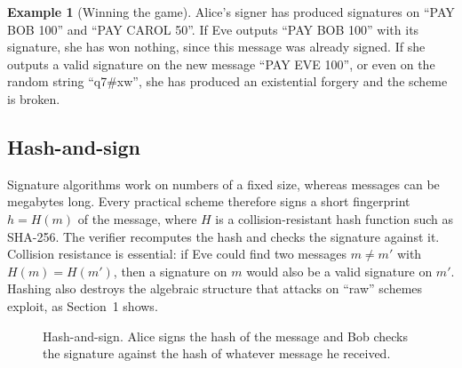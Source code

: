 \documentclass[11pt,a4paper]{article}
\theoremstyle{definition}
\newtheorem{example}[definition]{Example}
\newcommand{\Sign}{\mathsf{Sign}}
\newcommand{\Ver}{\mathsf{Ver}}
\newcommand{\sk}{\mathit{sk}}
\newcommand{\pk}{\mathit{pk}}
\newcommand{\Hash}{H}
\begin{document}
\begin{example}[Winning the game]
Alice's signer has produced signatures on ``PAY BOB 100'' and ``PAY CAROL 50''. If Eve outputs ``PAY BOB 100'' with its signature, she has won nothing, since this message was already signed. If she outputs a valid signature on the new message ``PAY EVE 100'', or even on the random string ``q7\#xw'', she has produced an existential forgery and the scheme is broken.
\end{example}

\subsection{Hash-and-sign}

Signature algorithms work on numbers of a fixed size, whereas messages can be megabytes long. Every practical scheme therefore signs a short fingerprint $h = \Hash(m)$ of the message, where $\Hash$ is a collision-resistant hash function such as SHA-256. The verifier recomputes the hash and checks the signature against it. Collision resistance is essential: if Eve could find two messages $m \neq m'$ with $\Hash(m)=\Hash(m')$, then a signature on $m$ would also be a valid signature on $m'$. Hashing also destroys the algebraic structure that attacks on ``raw'' schemes exploit, as Section~1 shows.

\begin{figure}[h]
\centering
{}
\caption{Hash-and-sign. Alice signs the hash of the message and Bob checks the signature against the hash of whatever message he received.}
\end{figure}
\end{document}
